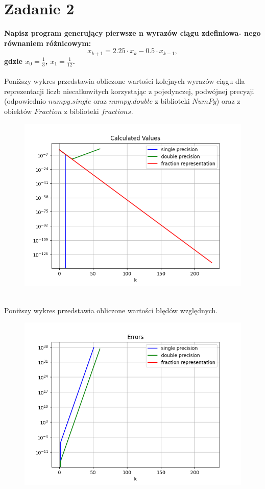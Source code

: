 \documentclass{article}
\begin{document}
\section*{Zadanie 2}
\textbf{Napisz program generujący pierwsze n wyrazów ciągu zdefiniowa-
nego równaniem różnicowym:
$$x_{k+1} = 2.25\cdot x_k - 0.5\cdot x_{k-1},$$
 gdzie $x_0 = \frac{1}{3}$, $ x_1 = \frac{1}{12}$.}
\\\\
Poniższy wykres przedstawia obliczone wartości 
kolejnych wyrazów ciągu dla reprezentacji liczb niecałkowitych 
korzystając z pojedynczej, podwójnej precyzji (odpowiednio
$numpy.single$ oraz $numpy.double$ z biblioteki $NumPy$) oraz z obiektów 
$Fraction$ z biblioteki $fractions$.
\begin{figure}[ht!]
    \includegraphics[width=\linewidth]{figures/calculated_values.png}
\end{figure}
\\
Poniższy wykres przedstawia obliczone wartości 
błędów względnych.
\begin{figure}[ht!]
    \includegraphics[width=\linewidth]{figures/errors.png}
\end{figure}
\end{document}
